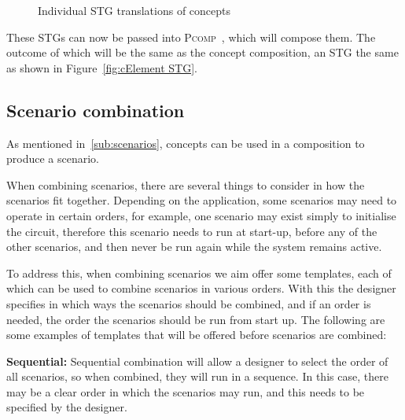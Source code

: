\documentclass[british,compsoc]{IEEEtran}
\newcommand{\noun}[1]{\textsc{#1}}
\begin{document}
\begin{figure}[h]
\begin{centering}
{}
\par\end{centering}

\protect\caption{\label{fig:IndividConceptStgs}Individual STG translations of concepts}
\end{figure}

These STGs can now be passed into \noun{Pcomp}~\cite{PCOMP}, which will compose them. The outcome of which will be the same as the concept composition, an STG the same as shown in
Figure~\ref{fig:cElement STG}.

\subsection{Scenario combination\label{sub:scenario-composition}}

As mentioned in~\ref{sub:scenarios}, concepts can be used in a composition to produce a scenario.

When combining scenarios, there are several things to consider in
how the scenarios fit together. Depending on the application,
some scenarios may need to operate in certain
orders, for example, one scenario may exist simply to initialise the
circuit, therefore this scenario needs to run at start-up, before
any of the other scenarios, and then never be run again while the
system remains active.

To address this, when combining scenarios we aim offer some templates,
each of which can be used to combine scenarios in various orders.
With this the designer specifies in which ways the scenarios should
be combined, and if an order is needed, the order the scenarios should
be run from start up. The following are some examples of templates
that will be offered before scenarios are combined:

\textbf{Sequential:} Sequential combination will allow a designer
to select the order of all scenarios, so when combined, they will
run in a sequence. In this case, there may be a clear order in which
the scenarios may run, and this needs to be specified by the designer.
\end{document}
